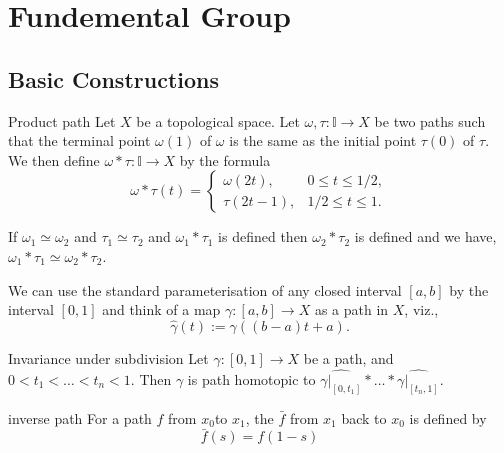 \documentclass[../main.tex]{subfiles}
\begin{document}
\chapter{ Fundemental Group }

\section{Basic Constructions}
\begin{definition}{Product path}{}
Let $X$ be a topological space. Let $\omega, \tau: \mathbb{I} \longrightarrow X$ be two paths such that the terminal point $\omega(1)$ of $\omega$ is the same as the initial point $\tau(0)$ of $\tau$. We then define $\omega * \tau: \mathbb{I} \longrightarrow X$ by the formula
\begin{equation}
\omega * \tau(t)=\left\{\begin{array}{ll}
\omega(2 t), & 0 \leq t \leq 1 / 2, \\
\tau(2 t-1), & 1 / 2 \leq t \leq 1 .
\end{array}\right.
\end{equation}
\end{definition}
\begin{lemma}{}{}
If $\omega_{1} \simeq \omega_{2}$ and $\tau_{1} \simeq \tau_{2}$ and $\omega_{1} * \tau_{1}$ is defined then $\omega_{2} * \tau_{2}$ is defined and we have, $\omega_{1} * \tau_{1} \simeq \omega_{2} * \tau_{2}$.
\end{lemma}

\begin{definition}{}{}
    We can use the standard parameterisation of any closed interval $[a, b]$ by the interval $[0, 1]$ and think of a map $\gamma : [a, b] \to X$ as a path in $X$, viz.,
\[
\hat{\gamma}(t) := \gamma((b - a)t + a).
\]
\end{definition}

\begin{theorem}{Invariance under subdivision}{}
Let $\gamma : [0,1] \to X$ be a path, and $0 < t_1 < \dots < t_n < 1$. Then $\gamma$ is path homotopic to $\widehat{\gamma|_{[0,t_1]}} * \dots * \widehat{\gamma|_{[t_n,1]}}$.
\end{theorem}

\begin{definition}{inverse path}{}
    For a path \(  f  \) from \(  x_0  \)to \(  x_1  \), the  \(  \bar{f}  \) from \(  x_1  \) back to \(  x_0  \) is defined by \[
    \bar{f}\left( s \right)= f\left( 1-s \right)  
    \]      
\end{definition}
\end{document}
